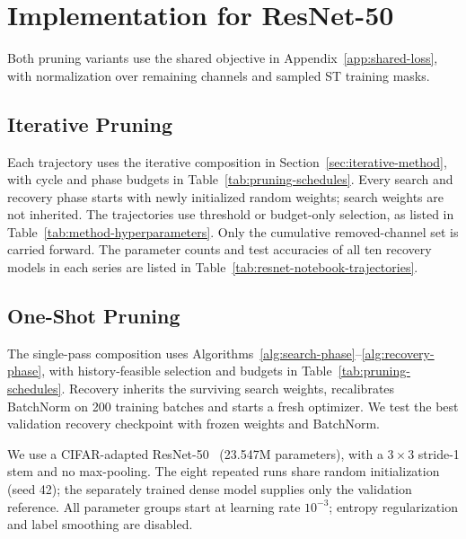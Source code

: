 \section{Implementation for ResNet-50}
\label{app:implementation-resnet50}

Both pruning variants use the shared objective in
Appendix~\ref{app:shared-loss}, with normalization over remaining channels
and sampled ST training masks.

\subsection{Iterative Pruning}
\label{sec:resnet-iterative-implementation}
Each trajectory uses the iterative composition in Section~\ref{sec:iterative-method}, with cycle
and phase budgets in Table~\ref{tab:pruning-schedules}.
Every search and recovery phase starts with newly initialized random
weights; search weights are not inherited. The trajectories use threshold or budget-only selection, as listed
in Table~\ref{tab:method-hyperparameters}. Only the cumulative removed-channel set is carried forward.
The parameter counts and test accuracies of all ten recovery models in
each series are listed in Table~\ref{tab:resnet-notebook-trajectories}.

\subsection{One-Shot Pruning}
\label{sec:resnet-cifar-implementation}
The single-pass composition uses Algorithms~\ref{alg:search-phase}--\ref{alg:recovery-phase},
with history-feasible selection and budgets in Table~\ref{tab:pruning-schedules}.
Recovery inherits the surviving search weights, recalibrates BatchNorm
on 200 training batches and starts a fresh optimizer. We test the
best validation recovery checkpoint with frozen weights and BatchNorm.

We use a CIFAR-adapted ResNet-50~\cite{he2015residual}
(23.547M parameters), with a $3\times3$ stride-1 stem and no
max-pooling. The eight repeated runs share random initialization
(seed 42); the separately trained dense model supplies only the
validation reference. All parameter groups start at learning rate
$10^{-3}$; entropy regularization and label smoothing are disabled.

